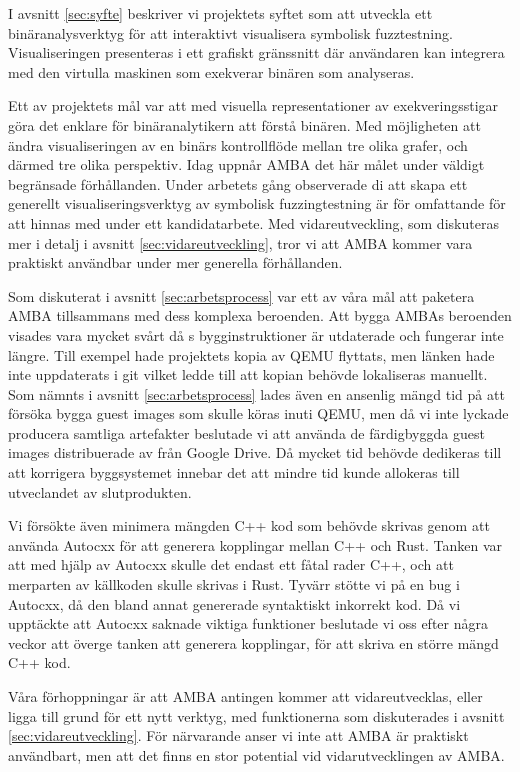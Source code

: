 I avsnitt \ref{sec:syfte} beskriver vi projektets syftet som att utveckla ett
binäranalysverktyg för att interaktivt visualisera symbolisk fuzztestning.
Visualiseringen presenteras i ett grafiskt gränssnitt där användaren kan
integrera med den virtulla maskinen som exekverar binären som analyseras.

Ett av projektets mål var att med visuella representationer av exekveringsstigar
göra det enklare för binäranalytikern att förstå binären. Med möjligheten att
ändra visualiseringen av en binärs kontrollflöde mellan tre olika grafer, och därmed
tre olika perspektiv. Idag uppnår AMBA det här målet under väldigt begränsade
förhållanden. Under arbetets gång observerade di att skapa ett generellt
visualiseringsverktyg av symbolisk fuzzingtestning är för omfattande för att
hinnas med under ett kandidatarbete. Med vidareutveckling, som diskuteras mer
i detalj i avsnitt \ref{sec:vidareutveckling}, tror vi att AMBA kommer vara
praktiskt användbar under mer generella förhållanden.

Som diskuterat i avsnitt \ref{sec:arbetsprocess} var ett av våra mål att
paketera AMBA tillsammans med dess komplexa beroenden. Att bygga AMBAs beroenden
visades vara mycket svårt då \stoe{}s bygginstruktioner är utdaterade och
fungerar inte längre. Till exempel hade \stoe{} projektets kopia av QEMU
flyttats, men länken hade inte uppdaterats i git vilket ledde till att kopian
behövde lokaliseras manuellt. Som nämnts i avsnitt \ref{sec:arbetsprocess} lades
även en ansenlig mängd tid på att försöka bygga guest images som skulle köras
inuti QEMU, men då vi inte lyckade producera samtliga artefakter beslutade vi
att använda de färdigbyggda guest images distribuerade av \stoe{} från Google
Drive. Då mycket tid behövde dedikeras till att korrigera byggsystemet innebar
det att mindre tid kunde allokeras till utveclandet av slutprodukten.

Vi försökte även minimera mängden C++ kod som behövde skrivas genom att använda
Autocxx för att generera kopplingar mellan C++ och Rust. Tanken var att med
hjälp av Autocxx skulle det endast ett fåtal rader C++, och att merparten av
källkoden skulle skrivas i Rust. Tyvärr stötte vi på en bug i Autocxx, då den
bland annat genererade syntaktiskt inkorrekt kod. Då vi upptäckte att Autocxx
saknade viktiga funktioner beslutade vi oss efter några veckor att överge tanken
att generera kopplingar, för att skriva en större mängd C++ kod.

Våra förhoppningar är att AMBA antingen kommer att vidareutvecklas, eller ligga
till grund för ett nytt verktyg, med funktionerna som diskuterades i avsnitt
\ref{sec:vidareutveckling}. För närvarande anser vi inte att AMBA är praktiskt
användbart, men att det finns en stor potential vid vidarutvecklingen av AMBA.